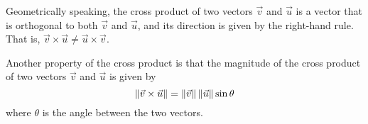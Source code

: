 Geometrically speaking, the cross product of two vectors $\vec{v}$ and
$\vec{u}$ is a vector that is orthogonal to both $\vec{v}$ and $\vec{u}$, and
its direction is given by the right-hand rule. That is, $\vec{v} \times \vec{u}
    \neq \vec{u} \times \vec{v}$. \vspace{1em}
\begin{center}
\end{center}

Another property of the cross product is that the magnitude of the cross
product of two vectors $\vec{v}$ and $\vec{u}$ is given by \[\left\lVert\vec{v} \times \vec{u}\right\rVert = \left\lVert\vec{v}\right\rVert \left\lVert\vec{u}\right\rVert \sin\theta\] where $\theta$ is the angle between the two vectors.

